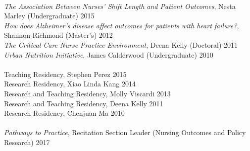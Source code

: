 \documentclass[10pt,]{article}
\begin{document}
{{{{{{{{{{{{{{{{{{{{{{{{{{{{{{\vspace{2mm} 
 \\
{\textit{The Association Between Nurses’ Shift Length and Patient Outcomes}}, Nesta Marley {\small{(Undergraduate)}} \hfill 2015\\
{\textit{How does Alzheimer’s disease affect outcomes for patients with heart failure?}}, Shannon Richmond {\small{(Master's)}} \hfill 2012\\	
{\textit{The Critical Care Nurse Practice Environment}}, Deena Kelly {\small{(Doctoral)}} \hfill 2011\\
{\textit{Urban Nutrition Initiative}}, James Calderwood {\small{(Undergraduate)}} \hfill 2010\\

\vspace{2mm} 
 \\
Teaching Residency, Stephen Perez \hfill 2015\\
Research Residency, Xiao Linda Kang \hfill 2014\\
Research and Teaching Residency, Molly Viscardi \hfill 2013\\
Research and Teaching Residency, Deena Kelly \hfill 2011\\
Research Residency, Chenjuan Ma \hfill 2010\\

\vspace{2mm} 
 \\
{\textit{Pathways to Practice}}, Recitation Section Leader {\small{(Nursing Outcomes and Policy Research)}} \hfill 2017\\

}}}}}}}}}}}}}}}}}}}}}}}}}}}}}}
\end{document}
